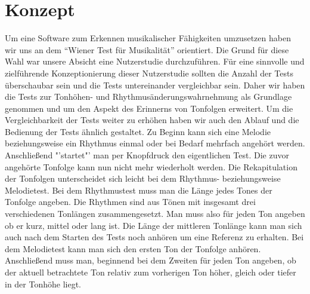 \documentclass{acm_proc_article-sp}
\begin{document}
\section{Konzept}
Um eine Software zum Erkennen musikalischer Fähigkeiten umzusetzen haben wir uns an dem "`Wiener Test für Musikalität"' orientiert.
Die Grund für diese Wahl war unsere Absicht eine Nutzerstudie durchzuführen. Für eine sinnvolle und zielführende Konzeptionierung dieser Nutzerstudie sollten die Anzahl der Tests überschaubar sein und die Tests untereinander vergleichbar sein.
Daher wir haben die Tests zur Tonhöhen- und Rhythmusänderungswahrnehmung als Grundlage genommen und um den Aspekt des Erinnerns von Tonfolgen erweitert.
Um die Vergleichbarkeit der Tests weiter zu erhöhen haben wir auch den Ablauf und die Bedienung der Tests ähnlich gestaltet.
Zu Beginn kann sich eine Melodie beziehungsweise ein Rhythmus einmal oder bei Bedarf mehrfach angehört werden. Anschließend "'startet"' man per Knopfdruck den eigentlichen Test. Die zuvor angehörte Tonfolge kann nun nicht mehr wiederholt werden. Die Rekapitulation der Tonfolgen unterscheidet sich leicht bei dem Rhythmus- beziehungsweise Melodietest. Bei dem Rhythmustest muss man die Länge jedes Tones der Tonfolge angeben. Die Rhythmen sind aus Tönen mit insgesamt drei verschiedenen Tonlängen zusammengesetzt. Man muss also für jeden Ton angeben ob er kurz, mittel oder lang ist. Die Länge der mittleren Tonlänge kann man sich auch nach dem Starten des Tests noch anhören um eine Referenz zu erhalten.
Bei dem Melodietest kann man sich den ersten Ton der Tonfolge anhören. Anschließend muss man, beginnend bei dem Zweiten für jeden Ton angeben, ob der aktuell betrachtete Ton relativ zum vorherigen Ton höher, gleich oder tiefer in der Tonhöhe liegt.
\end{document}
